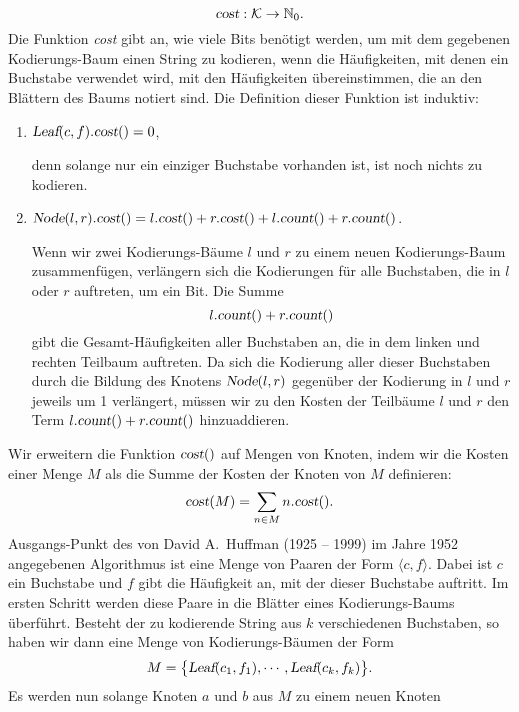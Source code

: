 \[ \textsl{cost}: \mathcal{K} \rightarrow {\mathbb N}_0. \]
Die Funktion \textsl{cost} gibt an, wie viele Bits ben\"otigt werden, um mit dem gegebenen
Kodierungs-Baum einen String zu kodieren, wenn die H\"aufigkeiten, mit denen ein Buchstabe
verwendet wird, mit den H\"aufigkeiten \"ubereinstimmen, die an den Bl\"attern des Baums notiert
sind.  Die Definition dieser Funktion ist induktiv:
\begin{enumerate}
\item $\textsl{Leaf}(c,f).\textsl{cost}() = 0$,

      denn solange nur ein einziger Buchstabe vorhanden ist, ist noch nichts zu kodieren.
\item $\textsl{Node}(l,r).\textsl{cost}() = 
       l.\textsl{cost}() + r.\textsl{cost}() + l.\textsl{count}() + r.\textsl{count}()$.

      Wenn wir zwei Kodierungs-B\"aume $l$ und $r$ zu einem neuen Kodierungs-Baum
      zusammenf\"ugen, verl\"angern sich die Kodierungen f\"ur alle Buchstaben, die in $l$ oder
      $r$ auftreten, um ein Bit.
      Die Summe 
      \[ l.\textsl{count}() + r.\textsl{count}() \]
      gibt die Gesamt-H\"aufigkeiten aller Buchstaben an, die in dem linken und
      rechten Teilbaum auftreten.  Da sich die Kodierung aller dieser Buchstaben
      durch die Bildung des Knotens $\textsl{Node}(l,r)$ gegen\"uber der Kodierung in $l$
      und $r$ jeweils um 1 verl\"angert, m\"ussen wir zu den Kosten der Teilb\"aume $l$ und $r$
      den Term $l.\textsl{count}() + r.\textsl{count}()$ hinzuaddieren.
\end{enumerate}
Wir erweitern die Funktion $\textsl{cost}()$ auf Mengen von Knoten, indem wir die Kosten
einer Menge $M$ als die Summe der Kosten der Knoten von $M$ definieren:
\[ \textsl{cost}(M) = \sum\limits_{n\in M} n.\textsl{cost}(). \]
Ausgangs-Punkt des von David A.~Huffman (1925 -- 1999) im Jahre 1952 angegebenen
Algorithmus \cite{huffman:52} ist eine Menge von Paaren der Form $\langle c, f\rangle$.  Dabei ist
$c$ ein 
Buchstabe und $f$ gibt die H\"aufigkeit an, mit der dieser Buchstabe auftritt.  Im ersten
Schritt werden diese Paare in die Bl\"atter eines Kodierungs-Baums \"uberf\"uhrt.  Besteht der
zu kodierende String aus  $k$ verschiedenen Buchstaben, so haben
wir dann eine Menge von Kodierungs-B\"aumen der Form
\begin{equation}
  \label{eq:huffmann1}
 M = \bigl\{  \textsl{Leaf}(c_1, f_1), \cdots, \textsl{Leaf}(c_k, f_k) \bigr\}.   
\end{equation}
Es werden nun solange Knoten $a$ und $b$ aus $M$ zu einem neuen Knoten
